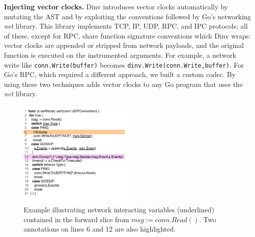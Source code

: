 \textbf{Injecting vector clocks.}
Dinv introduces vector clocks automatically by mutating the AST and by
exploiting the conventions followed by Go's networking \textit{net}
library. This library implements TCP, IP, UDP, RPC, and IPC protocols;
all of these, except for RPC, share function signature conventions which
Dinv wraps:
vector clocks are appended or stripped from network payloads, and the
original function is executed on the instrumented arguments. For
example, a network write like \texttt{conn.Write(buffer)} becomes
\texttt{dinv.Write(conn.Write,buffer)}.  For Go's RPC, which required
a different approach, we built a custom codec. By using these two
techniques \dinv adds vector clocks to any Go program that uses the
\textit{net} library.

%
%


\begin{figure}[t]
    \includegraphics[width=0.50\textwidth]{fig/data-flow-3}
    \caption{Example illustrating network interacting variables
      (underlined) contained in the forward slice from $msg :=
      conn.Read()$. Two annotations on lines 6 and 12 are also
      highlighted.
    }
  \label{fig:data-flow}
\end{figure}

